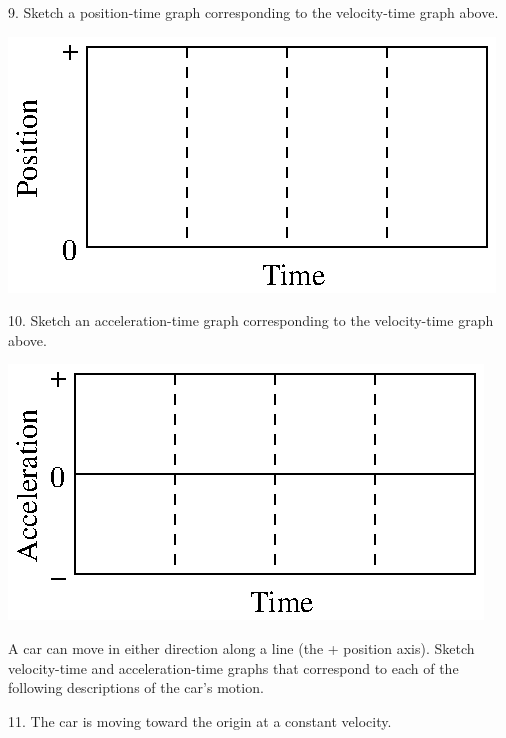 9. Sketch a position-time graph corresponding to the velocity-time graph above.

\vspace{0.3cm}
{\par\centering \includegraphics{slowing/slowing_fig13.eps} \par}
\vspace{0.3cm}

10. Sketch an acceleration-time graph corresponding to the velocity-time graph
above.

\vspace{0.3cm}
{\par\centering \includegraphics{slowing/slowing_fig14.eps} \par}
\vspace{0.3cm}

A car can move in either direction along a line (the + position axis). Sketch
velocity-time and acceleration-time graphs that correspond to each of the following
descriptions of the car's motion.

11. The car is moving toward the origin at a constant velocity.

